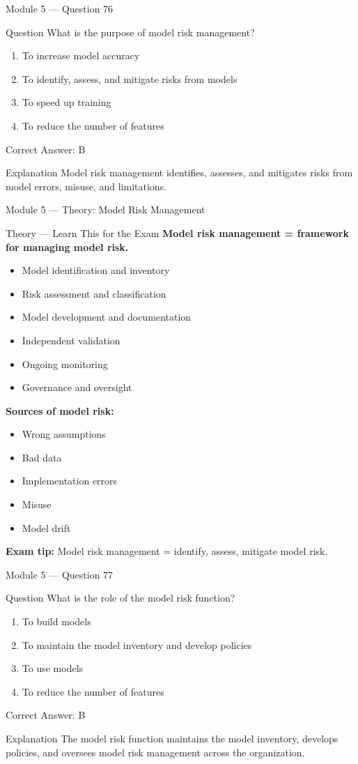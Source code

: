 \documentclass[aspectratio=169,10pt]{beamer}
\newcommand{\question}[1]{%
	\begin{block}{Question}
		#1
	\end{block}
}
\newcommand{\options}[4]{%
	\begin{enumerate}[label=\Alph*.,leftmargin=*]
		\item #1
		\item #2
		\item #3
		\item #4
	\end{enumerate}
}
\newcommand{\answerbox}[1]{%
	\begin{exampleblock}{Correct Answer: #1}
	\end{exampleblock}
}
\newcommand{\explain}[1]{%
	\begin{block}{Explanation}
		\small #1
	\end{block}
}
\newcommand{\theory}[1]{%
	\begin{block}{Theory --- Learn This for the Exam}
		\small #1
	\end{block}
}
\begin{document}
	\begin{frame}{Module 5 --- Question 76}
		\question{What is the purpose of model risk management?}
		\options{To increase model accuracy}{To identify, assess, and mitigate risks from models}{To speed up training}{To reduce the number of features}
		\answerbox{B}
		\explain{Model risk management identifies, assesses, and mitigates risks from model errors, misuse, and limitations.}
	\end{frame}
	
	\begin{frame}{Module 5 --- Theory: Model Risk Management}
		\theory{
			\textbf{Model risk management = framework for managing model risk.}
			\begin{itemize}
				\item Model identification and inventory
				\item Risk assessment and classification
				\item Model development and documentation
				\item Independent validation
				\item Ongoing monitoring
				\item Governance and oversight
			\end{itemize}
			\textbf{Sources of model risk:}
			\begin{itemize}
				\item Wrong assumptions
				\item Bad data
				\item Implementation errors
				\item Misuse
				\item Model drift
			\end{itemize}
			\textbf{Exam tip:} Model risk management = identify, assess, mitigate model risk.
		}
	\end{frame}
	
	\begin{frame}{Module 5 --- Question 77}
		\question{What is the role of the model risk function?}
		\options{To build models}{To maintain the model inventory and develop policies}{To use models}{To reduce the number of features}
		\answerbox{B}
		\explain{The model risk function maintains the model inventory, develops policies, and oversees model risk management across the organization.}
	\end{frame}
	
\end{document}

